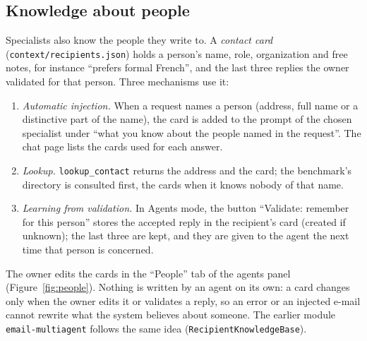 \documentclass[11pt,a4paper]{article}
\newcommand{\code}[1]{\texttt{#1}}
\begin{document}
\subsection{Knowledge about people}
\label{sec:people}
Specialists also know the people they write to. A \emph{contact card} (\code{context/recipients.json}) holds a person's
name, role, organization and free notes, for instance ``prefers formal French'', and the last three replies the owner
validated for that person. Three mechanisms use it:
\begin{enumerate}
  \item \emph{Automatic injection.} When a request names a person (address, full name or a distinctive part of the
        name), the card is added to the prompt of the chosen specialist under ``what you know about the people named in
        the request''. The chat page lists the cards used for each answer.
  \item \emph{Lookup.} \code{lookup\_contact} returns the address and the card; the benchmark's directory is consulted
        first, the cards when it knows nobody of that name.
  \item \emph{Learning from validation.} In Agents mode, the button ``Validate: remember for this person'' stores the
        accepted reply in the recipient's card (created if unknown); the last three are kept, and they are given to the
        agent the next time that person is concerned.
\end{enumerate}
The owner edits the cards in the ``People'' tab of the agents panel (Figure~\ref{fig:people}). Nothing is written by an agent on its own: a card
changes only when the owner edits it or validates a reply, so an error or an injected e-mail cannot rewrite what the
system believes about someone. The earlier module \code{email-multiagent} follows the same idea
(\code{RecipientKnowledgeBase}).
\end{document}
